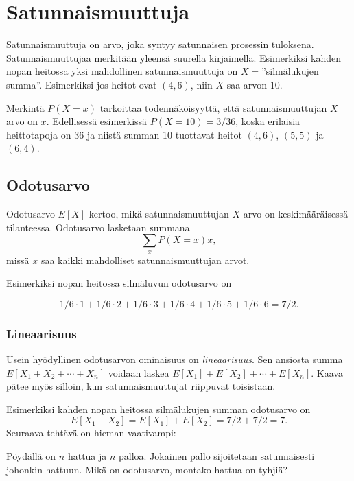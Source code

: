 \section{Satunnaismuuttuja}


Satunnaismuuttuja on arvo, joka syntyy satunnaisen
prosessin tuloksena.
Satunnaismuuttujaa merkitään yleensä
suurella kirjaimella.
Esimerkiksi kahden nopan heitossa yksi mahdollinen
satunnaismuuttuja on $X=$''silmälukujen summa''.
Esimerkiksi jos heitot ovat $(4,6)$,
niin $X$ saa arvon 10.

Merkintä $P(X=x)$ tarkoittaa todennäköisyyttä,
että satunnaismuuttujan $X$ arvo on $x$.
Edellisessä esimerkissä $P(X=10)=3/36$,
koska erilaisia heittotapoja on 36
ja niistä summan 10 tuottavat heitot
$(4,6)$, $(5,5)$ ja $(6,4)$.

\subsection{Odotusarvo}


Odotusarvo $E[X]$ kertoo, mikä satunnaismuuttujan $X$
arvo on keskimääräisessä tilanteessa.
Odotusarvo lasketaan summana
\[\sum_x P(X=x)x,\]
missä $x$ saa kaikki mahdolliset satunnaismuuttujan arvot.

Esimerkiksi nopan heitossa silmäluvun odotusarvo on

\[1/6 \cdot 1 + 1/6 \cdot 2 + 1/6 \cdot 3 + 1/6 \cdot 4 + 1/6 \cdot 5 + 1/6 \cdot 6 = 7/2.\]

\subsubsection*{Lineaarisuus}

Usein hyödyllinen odotusarvon ominaisuus on \textit{lineaarisuus}.
Sen ansiosta summa $E[X_1+X_2+\cdots+X_n]$ voidaan laskea $E[X_1]+E[X_2]+\cdots+E[X_n]$.
Kaava pätee myös silloin, kun satunnaismuuttujat riippuvat toisistaan.

Esimerkiksi kahden nopan heitossa silmälukujen summan odotusarvo on
\[E[X_1+X_2]=E[X_1]+E[X_2]=7/2+7/2=7.\]
Seuraava tehtävä on hieman vaativampi:

\begin{task}
Pöydällä on $n$ hattua ja $n$ palloa.
Jokainen pallo sijoitetaan satunnaisesti johonkin hattuun.
Mikä on odotusarvo, montako hattua on tyhjiä?
\end{task}

